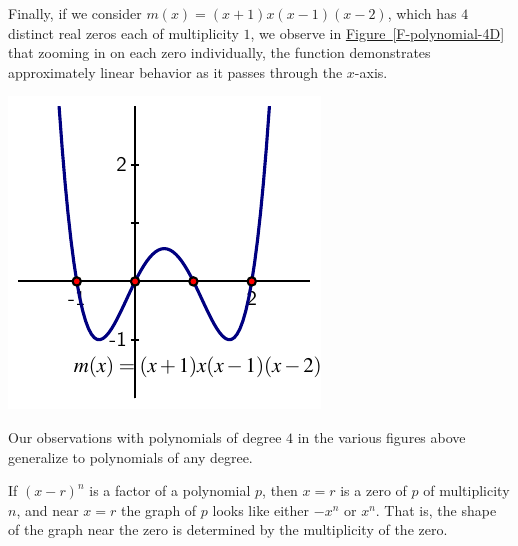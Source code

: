 \documentclass{ximera}
\begin{document}
Finally, if we consider $m(x) = (x+1)x(x-1)(x-2)$, which has $4$ distinct real zeros each of multiplicity $1$, we observe in \hyperref[F-polynomial-4D]{Figure~\ref{F-polynomial-4D}} that zooming in on each zero individually, the function demonstrates approximately linear behavior as it passes through the $x$-axis.%

\begin{image}
\includegraphics[width=0.5\linewidth]{images/polynomial-1-1-1-1}
\end{image}

Our observations with polynomials of degree $4$ in the various figures above generalize to polynomials of any degree.%


If $(x-r)^n$ is a factor of a polynomial $p$, then $x = r$ is a zero of $p$ of multiplicity $n$, and near $x = r$ the graph of $p$ looks like either $-x^n$ or $x^n$.  That is, the shape of the graph near the zero is determined by the multiplicity of the zero.%
\end{document}
